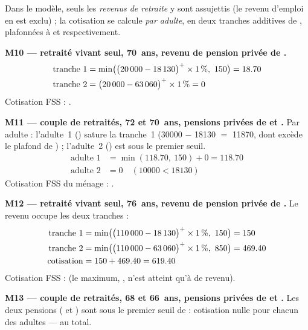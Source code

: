 \pexemples Dans le modèle, seuls les \emph{revenus de retraite} y sont assujettis
(le revenu d'emploi en est exclu) ; la cotisation se calcule \emph{par
adulte}, en deux tranches additives de , plafonnées à
 et  respectivement.

\medskip\noindent\textbf{M10 --- retraité vivant seul, 70~ans, revenu de pension privée de .}
\begin{align*}
\text{tranche 1} &= \min\bigl(\bigl(\num{20000} - \num{18130}\bigr)^{+} \times \num{1}\,\%,\ \num{150}\bigr) = \num{18.70} \\
\text{tranche 2} &= \bigl(\num{20000} - \num{63060}\bigr)^{+} \times \num{1}\,\% = 0
\end{align*}
Cotisation FSS : .

\medskip\noindent\textbf{M11 --- couple de retraités, 72 et 70~ans, pensions privées de  et .}
Par adulte : l'adulte~1 () sature la tranche~1
(\num{30000} $-$ \num{18130} $=$ \num{11870}, dont 
excède le plafond de ) ; l'adulte~2 () est sous le
premier seuil.
\begin{align*}
\text{adulte 1} &= \min(\num{118.70},\ \num{150}) + 0 = \num{118.70} \\
\text{adulte 2} &= 0 \quad (\num{10000} < \num{18130})
\end{align*}
Cotisation FSS du ménage : .

\medskip\noindent\textbf{M12 --- retraité vivant seul, 76~ans, revenu de pension privée de .}
Le revenu occupe les deux tranches :
\begin{align*}
\text{tranche 1} &= \min\bigl(\bigl(\num{110000} - \num{18130}\bigr)^{+} \times \num{1}\,\%,\ \num{150}\bigr) = \num{150} \\
\text{tranche 2} &= \min\bigl(\bigl(\num{110000} - \num{63060}\bigr)^{+} \times \num{1}\,\%,\ \num{850}\bigr) = \num{469.40} \\
\text{cotisation} &= \num{150} + \num{469.40} = \num{619.40}
\end{align*}
Cotisation FSS :  (le maximum, , n'est
atteint qu'à  de revenu).

\medskip\noindent\textbf{M13 --- couple de retraités, 68 et 66~ans, pensions privées de  et .}
Les deux pensions ( et ) sont sous le premier
seuil de  : cotisation nulle pour chacun des adultes —
 au total.
